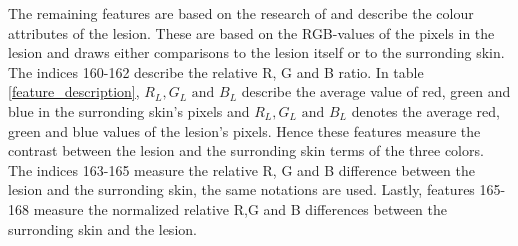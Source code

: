 \documentclass{kththesis}
\begin{document}
  The remaining features are based on the research of \parencite{celebi2008automatic} and describe the colour attributes of the lesion. These are based on the RGB-values of the pixels in the lesion and draws either comparisons to the lesion itself or to the surronding skin. 
  The indices 160-162 describe the relative R, G and B ratio. In table \ref{feature_description}, \(R_L, G_L \textrm{ and } B_L\) describe the average value of red, green and blue in the surronding skin's pixels and \(R_L, G_L \textrm{ and } B_L\) denotes the average red, green and blue values of the lesion's pixels. Hence these features measure the contrast between the lesion and the surronding skin terms of the three colors. The indices 163-165 measure the relative R, G and B difference between the lesion and the surronding skin, the same notations are used. Lastly, features 165-168 measure the  normalized relative R,G and B differences between the surronding skin and the lesion. \parencite{celebi2008automatic}
\end{document}
